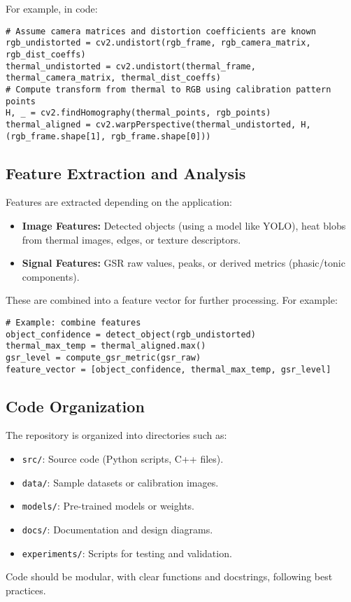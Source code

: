 \documentclass{article}
\begin{document}
    For example, in code:

    \begin{verbatim}
# Assume camera matrices and distortion coefficients are known
rgb_undistorted = cv2.undistort(rgb_frame, rgb_camera_matrix, rgb_dist_coeffs)
thermal_undistorted = cv2.undistort(thermal_frame, thermal_camera_matrix, thermal_dist_coeffs)
# Compute transform from thermal to RGB using calibration pattern points
H, _ = cv2.findHomography(thermal_points, rgb_points)
thermal_aligned = cv2.warpPerspective(thermal_undistorted, H, (rgb_frame.shape[1], rgb_frame.shape[0]))
    \end{verbatim}

    \subsection{Feature Extraction and Analysis}

    Features are extracted depending on the application:
    \begin{itemize}
        \item \textbf{Image Features:} Detected objects (using a model like YOLO), heat blobs from thermal images, edges, or texture descriptors.
        \item \textbf{Signal Features:} GSR raw values, peaks, or derived metrics (phasic/tonic components).
    \end{itemize}

    These are combined into a feature vector for further processing. For example:

    \begin{verbatim}
# Example: combine features
object_confidence = detect_object(rgb_undistorted)
thermal_max_temp = thermal_aligned.max()
gsr_level = compute_gsr_metric(gsr_raw)
feature_vector = [object_confidence, thermal_max_temp, gsr_level]
    \end{verbatim}

    \subsection{Code Organization}

    The repository is organized into directories such as:
    \begin{itemize}
        \item \texttt{src/}: Source code (Python scripts, C++ files).
        \item \texttt{data/}: Sample datasets or calibration images.
        \item \texttt{models/}: Pre-trained models or weights.
        \item \texttt{docs/}: Documentation and design diagrams.
        \item \texttt{experiments/}: Scripts for testing and validation.
    \end{itemize}
    Code should be modular, with clear functions and docstrings, following best practices.
\end{document}
